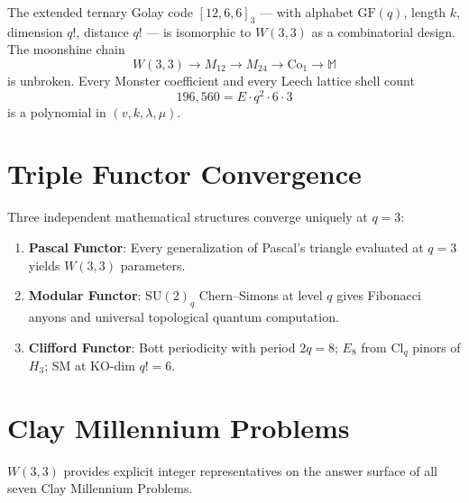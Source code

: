 \documentclass[12pt,a4paper]{article}
\begin{document}
The extended ternary Golay code $[12, 6, 6]_3$ --- with alphabet $\mathrm{GF}(q)$,
length $k$, dimension $q!$, distance $q!$ --- is isomorphic to $W(3,3)$ as a
combinatorial design. The moonshine chain
\begin{equation}
  W(3,3) \to M_{12} \to M_{24} \to \mathrm{Co}_1 \to \mathbb{M}
\end{equation}
is unbroken. Every Monster coefficient and every Leech lattice shell count
\begin{equation}
  196{,}560 = E \cdot q^2 \cdot 6 \cdot 3
\end{equation}
is a polynomial in $(v, k, \lambda, \mu)$.

\section{Triple Functor Convergence}

Three independent mathematical structures converge uniquely at $q = 3$:
\begin{enumerate}
  \item \textbf{Pascal Functor}: Every generalization of Pascal's triangle
        evaluated at $q=3$ yields $W(3,3)$ parameters.
  \item \textbf{Modular Functor}: $\mathrm{SU}(2)_q$ Chern--Simons at level $q$
        gives Fibonacci anyons and universal topological quantum computation.
  \item \textbf{Clifford Functor}: Bott periodicity with period $2q = 8$;
        $E_8$ from $\mathrm{Cl}_q$ pinors of $H_3$; SM at KO-dim $q! = 6$.
\end{enumerate}

\section{Clay Millennium Problems}

$W(3,3)$ provides explicit integer representatives on the answer surface of all
seven Clay Millennium Problems.
\end{document}
